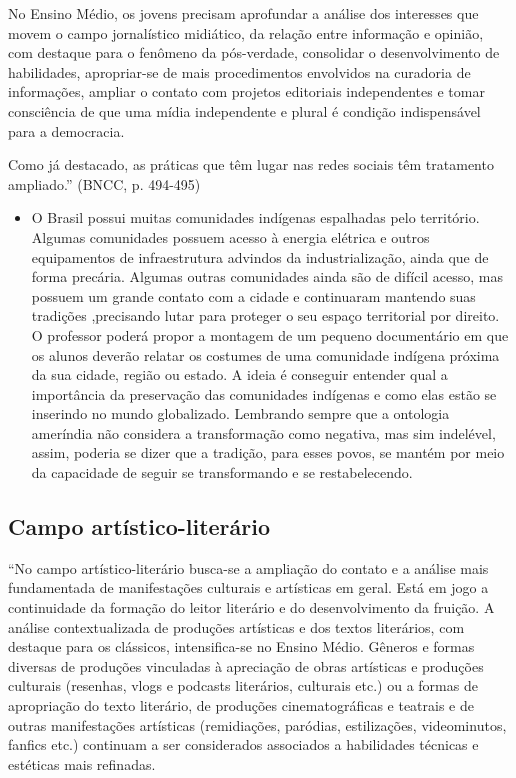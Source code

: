 \documentclass[12pt]{extarticle}
\begin{document}
No Ensino Médio, os jovens precisam aprofundar a análise dos interesses
que movem o campo jornalístico midiático, da relação entre informação e
opinião, com destaque para o fenômeno da pós-verdade, consolidar o
desenvolvimento de habilidades, apropriar-se de mais procedimentos
envolvidos na curadoria de informações, ampliar o contato com projetos
editoriais independentes e tomar consciência de que uma mídia
independente e plural é condição indispensável para a democracia.

Como já destacado, as práticas que têm lugar nas redes sociais têm
tratamento ampliado.'' (BNCC, p. 494-495)

\begin{itemize}
\item
  O Brasil possui muitas comunidades indígenas espalhadas pelo
  território. Algumas comunidades possuem acesso à energia elétrica e
  outros equipamentos de infraestrutura advindos da industrialização, ainda que de forma
  precária. Algumas outras comunidades ainda são de difícil acesso, mas
  possuem um grande contato com a cidade e continuaram mantendo suas
  tradições ,precisando lutar para proteger o seu espaço territorial por
  direito. O professor poderá propor a montagem de um pequeno
  documentário em que os alunos deverão relatar os costumes de uma
  comunidade indígena próxima da sua cidade, região ou estado. A ideia é
  conseguir entender qual a importância da preservação das comunidades
  indígenas e como elas estão se inserindo no mundo globalizado. Lembrando sempre que 
  a ontologia ameríndia não considera a transformação como negativa, mas sim indelével, assim, 
  poderia se dizer que a tradição, para esses povos, se mantém por meio da capacidade de seguir
  se transformando e se restabelecendo.
\end{itemize}

\subsection{Campo artístico-literário }

``No campo artístico-literário busca-se a ampliação do contato e a
análise mais fundamentada de manifestações culturais e artísticas em
geral. Está em jogo a continuidade da formação do leitor literário e do
desenvolvimento da fruição. A análise contextualizada de produções
artísticas e dos textos literários, com destaque para os clássicos,
intensifica-se no Ensino Médio. Gêneros e formas diversas de produções
vinculadas à apreciação de obras artísticas e produções culturais
(resenhas, vlogs e podcasts literários, culturais etc.) ou a formas de
apropriação do texto literário, de produções cinematográficas e teatrais
e de outras manifestações artísticas (remidiações, paródias,
estilizações, videominutos, fanfics etc.) continuam a ser considerados
associados a habilidades técnicas e estéticas mais refinadas.
\end{document}
